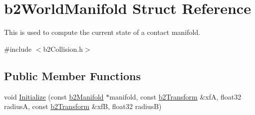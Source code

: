 \hypertarget{structb2WorldManifold}{}\section{b2\+World\+Manifold Struct Reference}
\label{structb2WorldManifold}


This is used to compute the current state of a contact manifold.  




{\ttfamily \#include $<$b2\+Collision.\+h$>$}

\subsection*{Public Member Functions}
\begin{DoxyCompactItemize}
\item 
void \mbox{\hyperlink{structb2WorldManifold_a896dd7e7d4d6f6a5bc69e19fbd6871bd}{Initialize}} (const \mbox{\hyperlink{structb2Manifold}{b2\+Manifold}} $\ast$manifold, const \mbox{\hyperlink{structb2Transform}{b2\+Transform}} \&xfA, float32 radiusA, const \mbox{\hyperlink{structb2Transform}{b2\+Transform}} \&xfB, float32 radiusB)
\end{DoxyCompactItemize}
